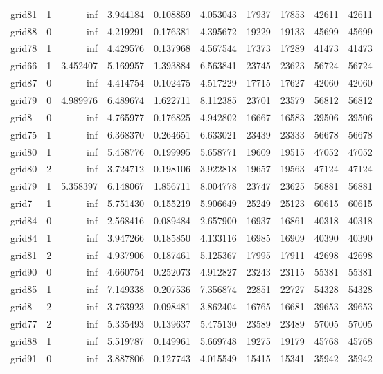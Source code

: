 \begin{longtable}{|l|r|r|r|r|r|r|r|r|r|}
grid81 & 1 & inf & 3.944184 & 0.108859 & 4.053043 & 17937 & 17853 & 42611 & 42611 \\
grid88 & 0 & inf & 4.219291 & 0.176381 & 4.395672 & 19229 & 19133 & 45699 & 45699 \\
grid78 & 1 & inf & 4.429576 & 0.137968 & 4.567544 & 17373 & 17289 & 41473 & 41473 \\
grid66 & 1 & 3.452407 & 5.169957 & 1.393884 & 6.563841 & 23745 & 23623 & 56724 & 56724 \\
grid87 & 0 & inf & 4.414754 & 0.102475 & 4.517229 & 17715 & 17627 & 42060 & 42060 \\
grid79 & 0 & 4.989976 & 6.489674 & 1.622711 & 8.112385 & 23701 & 23579 & 56812 & 56812 \\
grid8 & 0 & inf & 4.765977 & 0.176825 & 4.942802 & 16667 & 16583 & 39506 & 39506 \\
grid75 & 1 & inf & 6.368370 & 0.264651 & 6.633021 & 23439 & 23333 & 56678 & 56678 \\
grid80 & 1 & inf & 5.458776 & 0.199995 & 5.658771 & 19609 & 19515 & 47052 & 47052 \\
grid80 & 2 & inf & 3.724712 & 0.198106 & 3.922818 & 19657 & 19563 & 47124 & 47124 \\
grid79 & 1 & 5.358397 & 6.148067 & 1.856711 & 8.004778 & 23747 & 23625 & 56881 & 56881 \\
grid7 & 1 & inf & 5.751430 & 0.155219 & 5.906649 & 25249 & 25123 & 60615 & 60615 \\
grid84 & 0 & inf & 2.568416 & 0.089484 & 2.657900 & 16937 & 16861 & 40318 & 40318 \\
grid84 & 1 & inf & 3.947266 & 0.185850 & 4.133116 & 16985 & 16909 & 40390 & 40390 \\
grid81 & 2 & inf & 4.937906 & 0.187461 & 5.125367 & 17995 & 17911 & 42698 & 42698 \\
grid90 & 0 & inf & 4.660754 & 0.252073 & 4.912827 & 23243 & 23115 & 55381 & 55381 \\
grid85 & 1 & inf & 7.149338 & 0.207536 & 7.356874 & 22851 & 22727 & 54328 & 54328 \\
grid8 & 2 & inf & 3.763923 & 0.098481 & 3.862404 & 16765 & 16681 & 39653 & 39653 \\
grid77 & 2 & inf & 5.335493 & 0.139637 & 5.475130 & 23589 & 23489 & 57005 & 57005 \\
grid88 & 1 & inf & 5.519787 & 0.149961 & 5.669748 & 19275 & 19179 & 45768 & 45768 \\
grid91 & 0 & inf & 3.887806 & 0.127743 & 4.015549 & 15415 & 15341 & 35942 & 35942 \\

\end{longtable}
